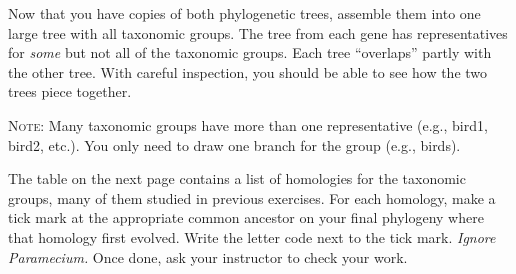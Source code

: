 \documentclass[12pt, hidelinks]{exam}
\begin{document}
	
	
	

\begin{questions}

\question
Now that you have copies of both phylogenetic trees, assemble them into one large tree with all taxonomic groups. The tree from each gene has representatives for \emph{some} but not all of the taxonomic groups. Each tree “overlaps” partly with the other tree. With careful inspection, you should be able to see how the two trees piece together. 

\textsc{Note:} Many taxonomic groups have more than one representative (e.g., bird1, bird2, etc.). You only need to draw one branch for the group (e.g., birds).

\question[Checkout]
The table on the next page contains a list of homologies for the taxonomic groups, many of them studied in previous exercises. For each homology, make a tick mark at the appropriate common ancestor on your final phylogeny where that homology first evolved. Write the letter code next to the tick mark. \textit{Ignore Paramecium.} Once done, ask your instructor to check your work.

\end{questions}

\newpage

\thispagestyle{empty}
\end{document}
